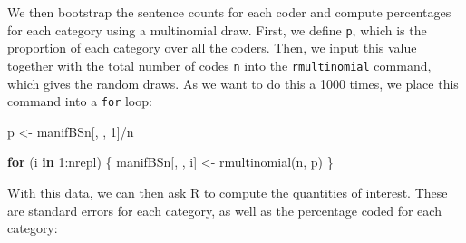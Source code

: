 \documentclass[
]{book}
\newenvironment{Shaded}{\begin{snugshade}}{\end{snugshade}}
\newcommand{\ControlFlowTok}[1]{\textcolor[rgb]{0.13,0.29,0.53}{\textbf{#1}}}
\newcommand{\DecValTok}[1]{\textcolor[rgb]{0.00,0.00,0.81}{#1}}
\newcommand{\FunctionTok}[1]{\textcolor[rgb]{0.00,0.00,0.00}{#1}}
\newcommand{\NormalTok}[1]{#1}
\newcommand{\OtherTok}[1]{\textcolor[rgb]{0.56,0.35,0.01}{#1}}
\newcommand{\SpecialCharTok}[1]{\textcolor[rgb]{0.00,0.00,0.00}{#1}}
\begin{document}
We then bootstrap the sentence counts for each coder and compute percentages for each category using a multinomial draw. First, we define \texttt{p}, which is the proportion of each category over all the coders. Then, we input this value together with the total number of codes \texttt{n} into the \texttt{rmultinomial} command, which gives the random draws. As we want to do this a 1000 times, we place this command into a \texttt{for} loop:

\begin{Shaded}
\begin{Highlighting}[]
\NormalTok{p }\OtherTok{\textless{}{-}}\NormalTok{ manifBSn[, , }\DecValTok{1}\NormalTok{]}\SpecialCharTok{/}\NormalTok{n}

\ControlFlowTok{for}\NormalTok{ (i }\ControlFlowTok{in} \DecValTok{1}\SpecialCharTok{:}\NormalTok{nrepl) \{}
\NormalTok{    manifBSn[, , i] }\OtherTok{\textless{}{-}} \FunctionTok{rmultinomial}\NormalTok{(n, p)}
\NormalTok{\}}
\end{Highlighting}
\end{Shaded}

With this data, we can then ask R to compute the quantities of interest. These are standard errors for each category, as well as the percentage coded for each category:
\end{document}
